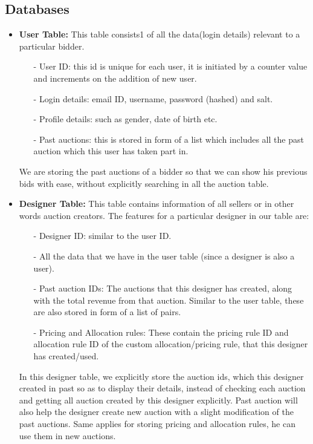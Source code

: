 \documentclass[a4paper]{article}
\begin{document}
\subsection*{Databases}
\begin{itemize}
    \item \textbf{User Table:} This table consists1 of all the data(login details) relevant to a particular bidder.
    \begin{itemize}
        \item[-] User ID: this id is unique for each user, it is initiated by a counter value and increments on the addition of new user.
        \item[-] Login details: email ID, username, password (hashed) and salt.
        \item[-] Profile details: such as gender, date of birth etc.
        \item[-] Past auctions: this is stored in form of a list which includes all the past auction which this user has taken part in.

    \end{itemize}
    We are storing the past auctions of a bidder so that we can show his previous bids with ease, without explicitly searching in all the auction table.

    \item \textbf{Designer Table:} This table contains information of all sellers or in other words auction creators. 
    The features for a particular designer in our table are:
    \begin{itemize}
        \item[-] Designer ID: similar to the user ID.
        \item[-] All the data that we have in the user table (since a designer is also a user).
        \item[-] Past auction IDs: The auctions that this designer has created, along with the total revenue from that auction. Similar to the user table, these are also stored in form of a list of pairs.
        \item[-] Pricing and Allocation rules: These contain the pricing rule ID and allocation rule ID of the custom allocation/pricing rule, that this designer has created/used.
    \end{itemize}
    In this designer table, we explicitly store the auction ids, which this designer created in past so as to display their details, instead of checking each auction and getting all auction created by this designer explicitly. 
    Past auction will also help the designer create new auction with a slight modification of the past auctions. 
    Same applies for storing pricing and allocation rules, he can use them in new auctions.


\end{itemize}
\end{document}
